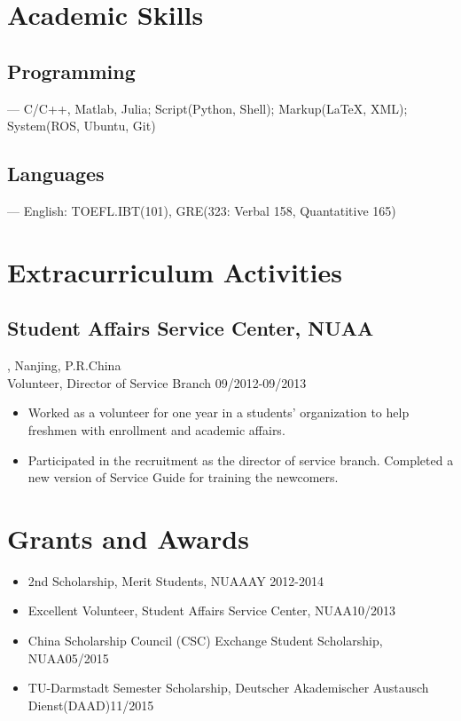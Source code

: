 \documentclass{article}
\begin{document}
\section{Academic Skills}
\subsection{Programming}
--- C/C++, Matlab, Julia; Script(Python, Shell); Markup({\LaTeX}, XML); System(ROS, Ubuntu, Git)
\subsection{Languages}
--- English: TOEFL.IBT(101), GRE(323: Verbal 158, Quantatitive 165)

\section{Extracurriculum Activities}
\subsection{Student Affairs Service Center, NUAA}, Nanjing, P.R.China\\
Volunteer, Director of Service Branch \hfill09/2012-09/2013
\begin{itemize}[noitemsep,topsep=1pt]
\item Worked as a volunteer for one year in a students' organization to help freshmen with enrollment and academic affairs.
\item Participated in the recruitment as the director of service branch. Completed a new version of Service Guide for training the newcomers.   
\end{itemize}

\section{Grants and Awards}
\begin{itemize}[noitemsep,topsep=1pt]
\item 2nd Scholarship, Merit Students, NUAA\hfill AY 2012-2014
\item Excellent Volunteer, Student Affairs Service Center, NUAA\hfill 10/2013
\item China Scholarship Council (CSC) Exchange Student Scholarship, NUAA\hfill 05/2015
\item TU-Darmstadt Semester Scholarship, Deutscher Akademischer Austausch Dienst(DAAD)\hfill 11/2015
\end{itemize}
\end{document}
